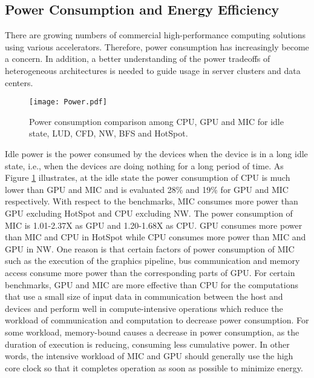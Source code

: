   
\subsection{Power Consumption and Energy Efficiency}

There are growing numbers of commercial high-performance computing solutions using various accelerators. Therefore, power consumption has increasingly become a concern. In addition, a better understanding of the power tradeoffs of heterogeneous architectures is needed to guide usage in server clusters and data centers. 

    \begin{figure}[h!]
  \centering
  \begin{minipage}{0.5\textwidth}
    \centering
   \centering
     \texttt{[image: Power.pdf]}    
\caption{Power consumption comparison among CPU, GPU and MIC for idle state, LUD, CFD, NW, BFS and HotSpot.}
\label{fig:power}
\end{minipage}%
\end{figure}

 Idle power is the power consumed by the devices when the device is in a long idle state, i.e., when the devices are doing nothing for a long period of time. As Figure \ref{fig:power} illustrates, at the idle state the power consumption of CPU is much lower than GPU and MIC and is evaluated 28\% and 19\% for GPU and MIC respectively. With respect to the benchmarks, MIC consumes more power than GPU excluding HotSpot and CPU excluding NW. The power consumption of MIC is 1.01-2.37X as GPU and 1.20-1.68X as CPU. GPU consumes more power than MIC and CPU in HotSpot while CPU consumes more power than MIC and GPU in NW. One reason is that certain factors of power consumption of MIC such as the execution of the graphics pipeline, bus communication and memory access consume more power than the corresponding parts of GPU. For certain benchmarks, GPU and MIC are more effective than CPU for the computations that use a small size of input data in communication between the host and devices and perform well in compute-intensive operations which reduce the workload of communication and computation to decrease power consumption. For some workload, memory-bound causes a decrease in power consumption, as the duration of execution is reducing, consuming less cumulative power. In other words, the intensive workload of MIC and GPU should generally use the high core clock so that it completes operation as soon as possible to minimize energy. 



